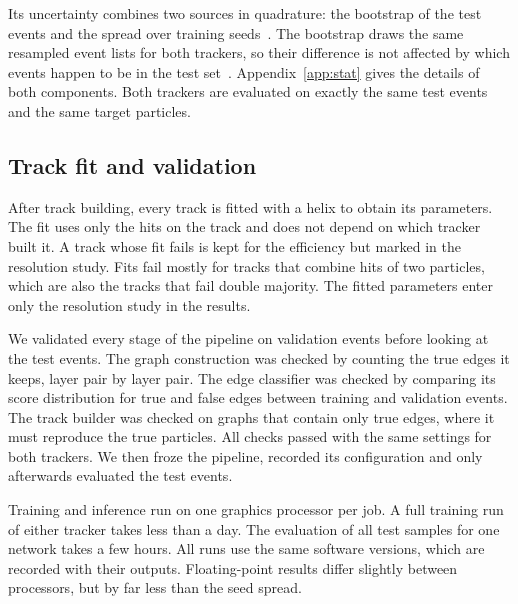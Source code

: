 Its uncertainty combines two sources in quadrature: the bootstrap of the test events and the spread over training seeds~\cite{Novak2023Bootstrap}. The bootstrap draws the same resampled event lists for both trackers, so their difference is not affected by which events happen to be in the test set~\cite{Quinn2016Statistics}. Appendix~\ref{app:stat} gives the details of both components. Both trackers are evaluated on exactly the same test events and the same target particles.

\subsection{Track fit and validation}
\label{sec:validation}

After track building, every track is fitted with a helix to obtain its parameters. The fit uses only the hits on the track and does not depend on which tracker built it. A track whose fit fails is kept for the efficiency but marked in the resolution study. Fits fail mostly for tracks that combine hits of two particles, which are also the tracks that fail double majority. The fitted parameters enter only the resolution study in the results.

We validated every stage of the pipeline on validation events before looking at the test events. The graph construction was checked by counting the true edges it keeps, layer pair by layer pair. The edge classifier was checked by comparing its score distribution for true and false edges between training and validation events. The track builder was checked on graphs that contain only true edges, where it must reproduce the true particles. All checks passed with the same settings for both trackers. We then froze the pipeline, recorded its configuration and only afterwards evaluated the test events.

Training and inference run on one graphics processor per job. A full training run of either tracker takes less than a day. The evaluation of all test samples for one network takes a few hours. All runs use the same software versions, which are recorded with their outputs. Floating-point results differ slightly between processors, but by far less than the seed spread.
